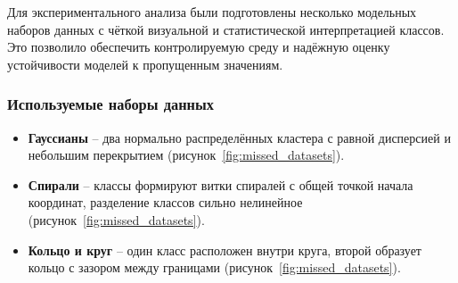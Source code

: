 Для экспериментального анализа были подготовлены несколько модельных наборов данных с чёткой визуальной и статистической интерпретацией классов. Это позволило обеспечить контролируемую среду и надёжную оценку устойчивости моделей к пропущенным значениям.

\subsubsection{Используемые наборы данных}
\begin{itemize}
    \item \textbf{Гауссианы} -- два нормально распределённых кластера с равной дисперсией и небольшим перекрытием (рисунок~\cref{fig:missed_datasets}).
    \item \textbf{Спирали} -- классы формируют витки спиралей с общей точкой начала координат, разделение классов сильно нелинейное (рисунок~\cref{fig:missed_datasets}).
    \item \textbf{Кольцо и круг} -- один класс расположен внутри круга, второй образует кольцо с зазором между границами (рисунок~\cref{fig:missed_datasets}).
\end{itemize}

